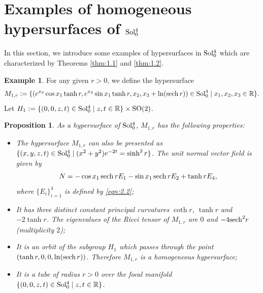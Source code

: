 \documentclass[reqno]{amsart}%
\newtheorem{proposition}[theorem]{Proposition}
\theoremstyle{definition}
\newtheorem{example}{Example}[section]  %
\numberwithin{equation}{section}
\begin{document}
	\section{Examples of homogeneous hypersurfaces of \texorpdfstring{${\rm Sol_0^4}$}{Sol40}}\label{sect:3}

	In this section, we introduce some examples of hypersurfaces in ${\rm Sol_0^4}$
	which are characterized by Theorems \ref{thm:1.1} and \ref{thm:1.2}.
	\begin{example}\label{exam:3.4}
		For any given $r>0$, we define the hypersurface
		$$
		M_{1,r}:=\{(e^{x_3}\cos x_1 \tanh r,e^{x_3}\sin x_1 \tanh r,x_2,{x_3}+\ln ({\rm sech}\, r))\in {\rm Sol_0^4}
		\mid x_1,x_2,x_3\in \mathbb{R}\}.
		$$
		Let $H_1:=\{(0,0,z,t)\in {\rm Sol_0^4}\mid z,t\in \mathbb{R}\}\times {\rm SO(2)}$.
		\begin{proposition}\label{prop:M1r}
			As a hypersurface of ${\rm Sol_0^4}$,
			$M_{1,r}$ has the following properties:
			\begin{itemize}
				
				\vskip1mm
				\item[(1)]
				The hypersurface $M_{1,r}$ can also be presented as $\{(x,y,z,t)\in {\rm Sol_0^4}
				\mid  (x^2+y^2)e^{-2t}=\sinh^2 r\}$. 
				The unit normal vector field is given by
				\begin{equation}\label{eqn:8.16}
					N=-\cos {x_1}\, {\rm sech}\, r E_1-\sin {x_1}\, {\rm sech}\, r E_2+\tanh r E_4,
				\end{equation}
				where $\{E_i\}_{i=1}^4$ is defined by \eqref{eqn:2.2};
				
				\vskip1mm
				\item[(2)]
				It has three distinct constant principal curvatures $\coth r$, $\tanh r$ and $-2\tanh r$. The eigenvalues of the Ricci tensor of $M_{1,r}$ are $0$ and $-4 {\rm sech}^2 r$ (multiplicity $2$); 
				
				\vskip1mm
				\item[(3)]
				It is an orbit of the subgroup $H_1$ which passes through the point
				$(\tanh r,0,0,\ln({\rm sech}\, r))$.
				Therefore $M_{1,r}$ is a homogeneous hypersurface;
				
				\vskip1mm
				\item[(4)]
				It is a tube of radius $r>0$ over the focal manifold
				$\{(0,0,z,t)\in {\rm Sol_0^4}\mid z,t\in \mathbb{R}\}$.
			\end{itemize}
		\end{proposition}
		

\end{example}
\end{document}
